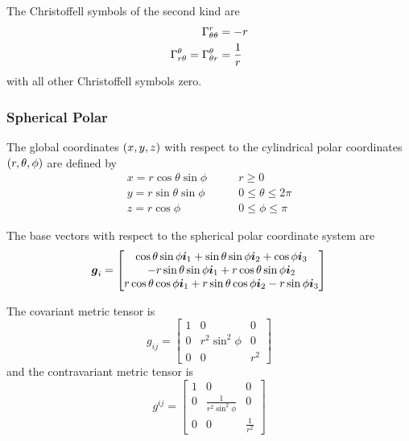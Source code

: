 The Christoffell symbols of the second kind are
\begin{align}
   \Gamma^{r}_{\theta\theta} &=-r \\
   \Gamma^{\theta}_{r\theta} = \Gamma^{\theta}_{\theta r} &=\frac{1}{r}
\end{align}
with all other Christoffell symbols zero.

\subsubsection{Spherical Polar}

The global coordinates $\left( x,y,z \right)$ with respect to the cylindrical polar
coordinates $\left( r,\theta,\phi \right)$ are defined by
\begin{equation}
  \begin{aligned}
    x = r\cos\theta\sin\phi & \qquad r \ge 0 \\
    y = r\sin\theta\sin\phi & \qquad 0 \le \theta \le 2\pi \\
    z = r\cos\phi & \qquad 0 \le \phi \le \pi
  \end{aligned}
\end{equation}

The base vectors with respect to the spherical polar coordinate system are
\begin{equation}
  \boldsymbol{g}_{i}=\begin{bmatrix} 
    \cos\theta\sin\phi\boldsymbol{i}_{1}+\sin\theta\sin\phi\boldsymbol{i}_{2}+\cos\phi\boldsymbol{i}_{3} \\ 
    -r\sin\theta\sin\phi\boldsymbol{i}_{1}+r\cos\theta\sin\phi\boldsymbol{i}_{2} \\
    r\cos\theta\cos\phi\boldsymbol{i}_{1}+r\sin\theta\cos\phi\boldsymbol{i}_{2}-r\sin\phi\boldsymbol{i}_{3}
  \end{bmatrix}
\end{equation}

The covariant metric tensor is
\begin{equation}
  g_{ij}=\begin{bmatrix}
    1 & 0 & 0 \\
    0 & r^{2}\sin^{2}\phi & 0 \\
    0 & 0 & r^{2} 
  \end{bmatrix}
\end{equation}
and the contravariant metric tensor is
\begin{equation}
  g^{ij}=\begin{bmatrix}
    1 & 0 & 0 \\
    0 &  \frac{1}{r^{2}\sin^{2}\phi} & 0 \\
    0 & 0 & \frac{1}{r^{2}} 
  \end{bmatrix}
\end{equation}


